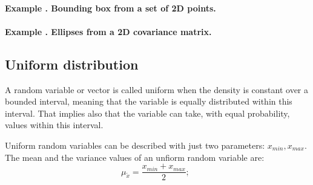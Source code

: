 \paragraph{Example \theexamplecounter. Bounding box from a set of 2D points.}

\paragraph{Example \theexamplecounter. Ellipses from a 2D covariance matrix.}



\subsection{Uniform distribution}
A random variable or vector is called uniform when the density is constant over a bounded interval, meaning that the variable is equally distributed within this interval. That implies also that the variable can take, with equal probability, values within this interval. 

Uniform random variables can be described with just two parameters: $x_{min}, x_{max}$. The mean and the variance values of an unfiorm random variable are:
\begin{equation}
 \mu_{\tilde{x}} = \frac{x_{min}+x_{max}}{2}; \ \ 
\end{equation}


